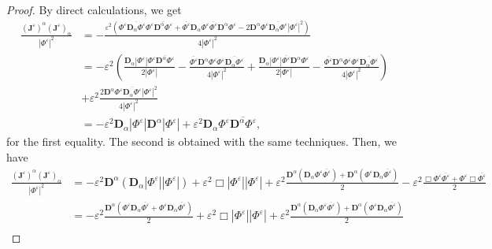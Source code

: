 \documentclass[a4paper, 15pt]{article}
\numberwithin{equation}{section}
\begin{document}
\begin{proof}
    By direct calculations, we get  
               \begin{align*}
         \frac{(\textbf{J}^\varepsilon)^\alpha(\textbf{J}^\varepsilon)_\alpha}{|\Phi^\varepsilon|^2}&=-\frac{\varepsilon^2(\Phi^\varepsilon\overline{\textbf{D}_\alpha\Phi^\varepsilon}\Phi^\varepsilon\overline{\textbf{D}^\alpha\Phi^\varepsilon}+\overline{\Phi^\varepsilon}\textbf{D}_\alpha\Phi^\varepsilon\overline{\Phi^\varepsilon}\textbf{D}^\alpha\Phi^\varepsilon-2\textbf{D}^\alpha\Phi^\varepsilon\overline{\textbf{D}_\alpha\Phi^\varepsilon}|\Phi^\varepsilon|^2)}{4|\Phi^\varepsilon|^2}\\
     &=-\varepsilon^2(\frac{\textbf{D}_\alpha|\Phi^\varepsilon|\Phi^\varepsilon\overline{\textbf{D}^\alpha\Phi^\varepsilon}}{2|\Phi^\varepsilon|}-\frac{\overline{\Phi^\varepsilon}\textbf{D}^\alpha\Phi^\varepsilon\Phi^\varepsilon\overline{\textbf{D}_\alpha\Phi^\varepsilon}}{4|\Phi^\varepsilon|^2}+\frac{\textbf{D}_\alpha|\Phi^\varepsilon|\overline{\Phi^\varepsilon}\textbf{D}^\alpha\Phi^\varepsilon}{2|\Phi^\varepsilon|}-\frac{\overline{\Phi^\varepsilon}\textbf{D}^\alpha\Phi^\varepsilon\Phi^\varepsilon\overline{\textbf{D}_\alpha\Phi^\varepsilon}}{4|\Phi^\varepsilon|^2})\\
     &+\varepsilon^2\frac{2\textbf{D}^\alpha\Phi^\varepsilon\overline{\textbf{D}_\alpha\Phi^\varepsilon}|\Phi^\varepsilon|^2}{4|\Phi^\varepsilon|^2}\\
     &=-\varepsilon^2\textbf{D}_\alpha|\Phi^\varepsilon|\textbf{D}^\alpha|\Phi^\varepsilon|+\varepsilon^2\textbf{D}_\alpha\Phi^\varepsilon\overline{\textbf{D}^\alpha\Phi^\varepsilon},
    \end{align*}
    for the first equality. The second is obtained with the same techniques. Then, we have
    \begin{align*}
         \frac{(\textbf{J}^\varepsilon)^\alpha(\textbf{J}^\varepsilon)_\alpha}{|\Phi^\varepsilon|^2}&=-\varepsilon^2\textbf{D}^\alpha(\textbf{D}_\alpha|\Phi^\varepsilon||\Phi^\varepsilon|)+\varepsilon^2\Box|\Phi^\varepsilon||\Phi^\varepsilon|+\varepsilon^2\frac{\textbf{D}^\alpha(\textbf{D}_\alpha\Phi^\varepsilon\overline{\Phi^\varepsilon})+\textbf{D}^\alpha(\Phi^\varepsilon\textbf{D}_\alpha\overline{\Phi^\varepsilon})}{2}-\varepsilon^2\frac{\Box\Phi^\varepsilon\overline{\Phi^\varepsilon}+\Phi^\varepsilon\Box\overline{\Phi^\varepsilon}}{2}\\
         &=-\varepsilon^2\frac{\textbf{D}^\alpha(\Phi^\varepsilon\textbf{D}_\alpha\overline{\Phi^\varepsilon}+\Phi^\varepsilon\textbf{D}_\alpha\overline{\Phi^\varepsilon})}{2}+\varepsilon^2\Box|\Phi^\varepsilon||\Phi^\varepsilon|+\varepsilon^2\frac{\textbf{D}^\alpha(\textbf{D}_\alpha\Phi^\varepsilon\overline{\Phi^\varepsilon})+\textbf{D}^\alpha(\Phi^\varepsilon\textbf{D}_\alpha\overline{\Phi^\varepsilon})}{2}\\

\end{align*}
\end{proof}
\end{document}
